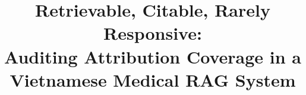 \documentclass[conference,a4paper]{IEEEtran}
\begin{document}
%
%
%
%
\title{Retrievable, Citable, Rarely Responsive:\\Auditing Attribution Coverage in a Vietnamese Medical RAG System}
\end{document}
